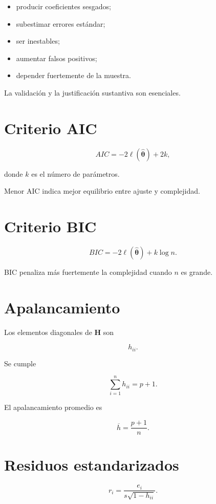 \documentclass[
  spanish,
  11pt,
  letterpaper,
  DIV=11,
  numbers=noendperiod]{scrreprt}
\providecommand{\tightlist}{%
  \setlength{\itemsep}{0pt}\setlength{\parskip}{0pt}}
\theoremstyle{definition}
\theoremstyle{plain}
\theoremstyle{definition}
\theoremstyle{remark}
\begin{document}
\begin{itemize}
\tightlist
\item
  producir coeficientes sesgados;
\item
  subestimar errores estándar;
\item
  ser inestables;
\item
  aumentar falsos positivos;
\item
  depender fuertemente de la muestra.
\end{itemize}

La validación y la justificación sustantiva son esenciales.

\section{Criterio AIC}\label{criterio-aic}

\[
AIC
=
-2\ell(\widehat{\boldsymbol{\theta}})
+
2k,
\]

donde \(k\) es el número de parámetros.

Menor AIC indica mejor equilibrio entre ajuste y complejidad.

\section{Criterio BIC}\label{criterio-bic}

\[
BIC
=
-2\ell(\widehat{\boldsymbol{\theta}})
+
k\log n.
\]

BIC penaliza más fuertemente la complejidad cuando \(n\) es grande.

\section{Apalancamiento}\label{apalancamiento-1}

Los elementos diagonales de \(\mathbf{H}\) son

\[
h_{ii}.
\]

Se cumple

\[
\sum_{i=1}^{n}h_{ii}
=
p+1.
\]

El apalancamiento promedio es

\[
\overline{h}
=
\frac{
p+1
}{
n
}.
\]

\section{Residuos estandarizados}\label{residuos-estandarizados-1}

\[
r_i
=
\frac{
e_i
}{
s\sqrt{1-h_{ii}}
}.
\]
\end{document}
